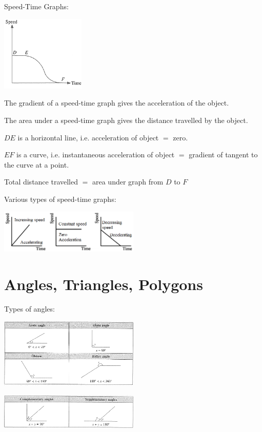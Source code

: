 \documentclass[twocolumn]{article}
\begin{document}
\begin{enumerate}
\bigskip 

\bigskip 

\noindent 
Speed-Time Graphs:

\includegraphics[width=0.3\textwidth]{14.png}

\noindent 
The gradient of a speed-time graph gives the acceleration of the object.

\noindent 
The area under a speed-time graph gives the distance travelled by the object.

\noindent 
$D E$ is a horizontal line, i.e. acceleration of object $=$ zero.

\noindent 
$E F$ is a curve, i.e. instantaneous acceleration of object $=$ gradient of tangent to the curve at a point.

\noindent 
Total distance travelled $=$ area under graph from $D$ to $F$

\bigskip

\noindent
Various types of speed-time graphs:

\includegraphics[width=0.5\textwidth]{18.png}

\newpage 

\section*{Angles, Triangles, Polygons}

\noindent
Types of angles:

\includegraphics[width=0.5\textwidth]{19.png}

\includegraphics[width=0.5\textwidth]{22.png}


\end{enumerate}
\end{document}
